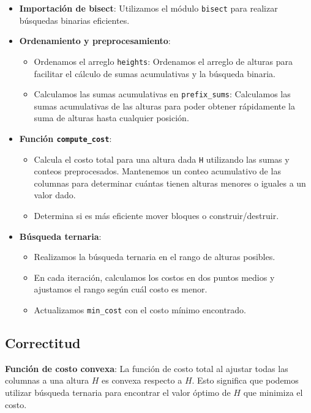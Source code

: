 \documentclass[a4paper,12pt]{article}
\begin{document}
\begin{itemize}
	\item \textbf{Importación de bisect}: Utilizamos el módulo \texttt{bisect} para realizar búsquedas binarias eficientes.
	\item \textbf{Ordenamiento y preprocesamiento}:
	\begin{itemize}
		\item Ordenamos el arreglo \texttt{heights}: Ordenamos el arreglo de alturas para facilitar el cálculo de sumas acumulativas y la búsqueda binaria.
		\item Calculamos las sumas acumulativas en \texttt{prefix\_sums}: Calculamos las sumas acumulativas de las alturas para poder obtener rápidamente la suma de alturas hasta cualquier posición.
	\end{itemize}
	\item \textbf{Función \texttt{compute\_cost}}:
	\begin{itemize}
		\item Calcula el costo total para una altura dada \texttt{H} utilizando las sumas y conteos preprocesados. Mantenemos un conteo acumulativo de las columnas para determinar cuántas tienen alturas menores o iguales a un valor dado.
		\item Determina si es más eficiente mover bloques o construir/destruir.
	\end{itemize}
	\item \textbf{Búsqueda ternaria}:
	\begin{itemize}
		\item Realizamos la búsqueda ternaria en el rango de alturas posibles.
		\item En cada iteración, calculamos los costos en dos puntos medios y ajustamos el rango según cuál costo es menor.
		\item Actualizamos \texttt{min\_cost} con el costo mínimo encontrado.
	\end{itemize}
\end{itemize}

\subsection{Correctitud}

\textbf{Función de costo convexa}: La función de costo total al ajustar todas las columnas a una altura $H$ es convexa respecto a $H$. Esto significa que podemos utilizar búsqueda ternaria para encontrar el valor óptimo de $H$ que minimiza el costo.
\end{document}
